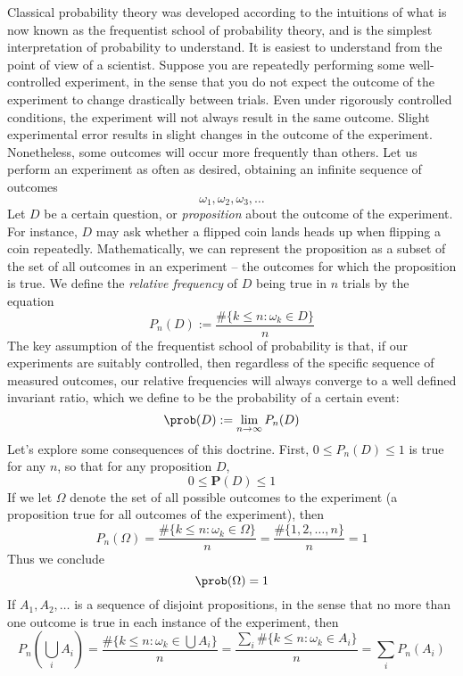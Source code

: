 Classical probability theory was developed according to the intuitions of what is now known as the frequentist school of probability theory, and is the simplest interpretation of probability to understand. It is easiest to understand from the point of view of a scientist. Suppose you are repeatedly performing some well-controlled experiment, in the sense that you do not expect the outcome of the experiment to change drastically between trials. Even under rigorously controlled conditions, the experiment will not always result in the same outcome. Slight experimental error results in slight changes in the outcome of the experiment. Nonetheless, some outcomes will occur more frequently than others. Let us perform an experiment as often as desired, obtaining an infinite sequence of outcomes
%
\[ \omega_1, \omega_2, \omega_3, \dots \]
%
Let $D$ be a certain question, or {\it proposition} about the outcome of the experiment. For instance, $D$ may ask whether a flipped coin lands heads up when flipping a coin repeatedly. Mathematically, we can represent the proposition as a subset of the set of all outcomes in an experiment -- the outcomes for which the proposition is true. We define the {\it relative frequency} of $D$ being true in $n$ trials by the equation
%
\[ P_n(D) := \frac{\# \{ k \leq n : \omega_k \in D \}}{n} \]
%
The key assumption of the frequentist school of probability is that, if our experiments are suitably controlled, then regardless of the specific sequence of measured outcomes, our relative frequencies will always converge to a well defined invariant ratio, which we define to be the probability of a certain event:
%
\[ \prob(D) := \lim_{n \to \infty} P_n(D) \]
%
Let's explore some consequences of this doctrine. First, $0 \leq P_n(D) \leq 1$ is true for any $n$, so that for any proposition $D$,
%
\begin{equation}\label{prob0lessthan1} 0 \leq \mathbf{P}(D) \leq 1 \end{equation}
%
If we let $\Omega$ denote the set of all possible outcomes to the experiment (a proposition true for all outcomes of the experiment), then
%
\[ P_n(\Omega) = \frac{\# \{ k \leq n : \omega_k \in \Omega\}}{n} = \frac{\# \{ 1, 2, \dots, n \}}{n} = 1 \]
%
Thus we conclude
%
\begin{equation}\label{probspace1} \prob(\Omega) = 1 \end{equation}
%
If $A_1, A_2, \dots$ is a sequence of disjoint propositions, in the sense that no more than one outcome is true in each instance of the experiment, then
%
\[ P_n \left( \bigcup_i A_i \right) = \frac{\# \{ k \leq n : \omega_k \in \bigcup A_i \}}{n} = \frac{\sum_i \# \{ k \leq n : \omega_k \in A_i \}}{n} = \sum_i P_n(A_i) \]
